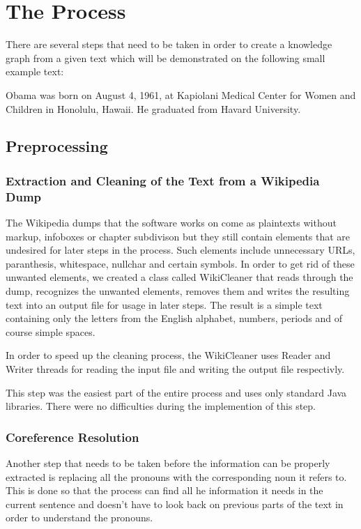 \documentclass[runningheads]{llncs}
\begin{document}
\section{The Process}
There are several steps that need to be taken in order to create a knowledge graph from a given text which will be demonstrated on the following small example text: 
\begin{example} Obama was born on August 4, 1961, at Kapiolani Medical Center for Women and Children in Honolulu, Hawaii. He graduated from Havard University.\end{example}
\subsection{Preprocessing}
\subsubsection{Extraction and Cleaning of the Text from a Wikipedia Dump}
The Wikipedia dumps that the software works on come as plaintexts without markup, infoboxes or chapter subdivison but they still contain elements that are undesired for later steps in the process. Such elements include unnecessary URLs, paranthesis, whitespace, nullchar and certain symbols. In order to get rid of these unwanted elements, we created a class called WikiCleaner that reads through the dump, recognizes the unwanted elements, removes them and writes the resulting text into an output file for usage in later steps. The result is a simple text containing only the letters from the English alphabet, numbers, periods and of course simple spaces.  

In order to speed up the cleaning process, the WikiCleaner uses Reader and Writer threads for reading the input file and writing the output file respectivly. 

This step was the easiest part of the entire process and uses only standard Java libraries. There were no difficulties during the implemention of this step. 

\subsubsection{Coreference Resolution}
Another step that needs to be taken before the information can be properly extracted is replacing all the pronouns with the corresponding noun it refers to. This is done so that the process can find all he information it needs in the current sentence and doesn't have to look back on previous parts of the text in order to understand the pronouns. 
\end{document}
